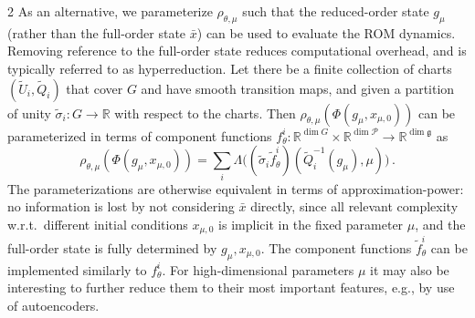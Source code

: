 \documentclass{article}
\newcommand{\g}{\mathfrak{g}}                               %
\newcommand{\R}{\mathbb{R}}                                 %
\newcommand{\state}{x}
\newcommand{\appstate}{\bar{x}}
\newcommand{\Coord}{Q}                                      %
\begin{document}
\begin{multicols}{2}
As an alternative, we parameterize $\rho_{\theta,\mu}$ such that the reduced-order state $g_\mu$ (rather than the full-order state $\appstate$) can be used to evaluate the ROM dynamics. Removing reference to the full-order state reduces computational overhead, and is typically referred to as hyperreduction. %
Let there be a finite collection of charts $(\widetilde{U}_i,\widetilde{\Coord}_i)$ that cover $G$ and have smooth transition maps, and given a partition of unity $\widetilde{\sigma}_i:G\rightarrow\R$ with respect to the charts. Then $\rho_{\theta,\mu}(\Phi(g_\mu,\state_{\mu,0}))$ can be parameterized in terms of component functions $f^i_\theta:\R^{\dim G}\times \R^{\dim \mathcal{P}} \rightarrow \R^{\dim \g}$ as
\begin{equation}
    \rho_{\theta,\mu}(\Phi(g_\mu,\state_{\mu,0})) = \sum_i \Lambda\big((\widetilde{\sigma}_i \widetilde{f}^i_\theta)(\widetilde{\Coord}_i^{-1}(g_\mu),\mu)\big)\,.
\end{equation}
The parameterizations are otherwise equivalent in terms of approximation-power: no information is lost by not considering $\appstate$ directly, since all relevant complexity w.r.t.\ different initial conditions $\state_{\mu,0}$ is implicit in the fixed parameter $\mu$, and the full-order state is fully determined by $g_\mu, \state_{\mu,0}$. The component functions $\widetilde{f}^i_\theta$ can be implemented similarly to $f^i_\theta$. For high-dimensional parameters $\mu$ it may also be interesting to further reduce them to their most important features, e.g., by use of autoencoders.



\end{multicols}
\end{document}
